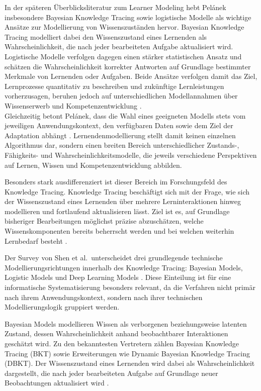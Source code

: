 In der späteren Überblicksliteratur zum Learner Modeling hebt Pelánek
insbesondere Bayesian Knowledge Tracing sowie logistische Modelle als
wichtige Ansätze zur Modellierung von Wissenszuständen hervor. Bayesian
Knowledge Tracing modelliert dabei den Wissenszustand eines Lernenden
als Wahrscheinlichkeit, die nach jeder bearbeiteten Aufgabe aktualisiert
wird. Logistische Modelle verfolgen dagegen einen stärker statistischen
Ansatz und schätzen die Wahrscheinlichkeit korrekter Antworten auf
Grundlage bestimmter Merkmale von Lernenden oder Aufgaben. Beide Ansätze
verfolgen damit das Ziel, Lernprozesse quantitativ zu beschreiben und
zukünftige Lernleistungen vorherzusagen, beruhen jedoch auf
unterschiedlichen Modellannahmen über Wissenserwerb und
Kompetenzentwicklung \citep{Pelanek2017}.\\
Gleichzeitig betont Pelánek, dass die Wahl eines geeigneten Modells
stets vom jeweiligen Anwendungskontext, den verfügbaren Daten sowie dem
Ziel der Adaptation abhängt \citep{Pelanek2017}. Lernendenmodellierung
stellt damit keinen einzelnen Algorithmus dar, sondern einen breiten
Bereich unterschiedlicher Zustands-, Fähigkeits- und
Wahrscheinlichkeitsmodelle, die jeweils verschiedene Perspektiven auf
Lernen, Wissen und Kompetenzentwicklung abbilden.

Besonders stark ausdifferenziert ist dieser Bereich im Forschungsfeld
des Knowledge Tracing. Knowledge Tracing beschäftigt sich mit der Frage,
wie sich der Wissenszustand eines Lernenden über mehrere
Lerninteraktionen hinweg modellieren und fortlaufend aktualisieren
lässt. Ziel ist es, auf Grundlage bisheriger Bearbeitungen möglichst
präzise abzuschätzen, welche Wissenskomponenten bereits beherrscht
werden und bei welchen weiterhin Lernbedarf besteht
\citep{Abdelrahman2023}.

Der Survey von Shen et al.~unterscheidet drei grundlegende technische
Modellierungsrichtungen innerhalb des Knowledge Tracing: Bayesian
Models, Logistic Models und Deep Learning Models \citep{Shen2024}. Diese
Einteilung ist für eine informatische Systematisierung besonders
relevant, da die Verfahren nicht primär nach ihrem Anwendungskontext,
sondern nach ihrer technischen Modellierungslogik gruppiert werden.

Bayesian Models modellieren Wissen als verborgenen beziehungsweise
latenten Zustand, dessen Wahrscheinlichkeit anhand beobachtbarer
Interaktionen geschätzt wird. Zu den bekanntesten Vertretern zählen
Bayesian Knowledge Tracing (BKT) sowie Erweiterungen wie Dynamic
Bayesian Knowledge Tracing (DBKT). Der Wissenszustand eines Lernenden
wird dabei als Wahrscheinlichkeit dargestellt, die nach jeder
bearbeiteten Aufgabe auf Grundlage neuer Beobachtungen aktualisiert wird
\citep{Pelanek2017, Shen2024}.

